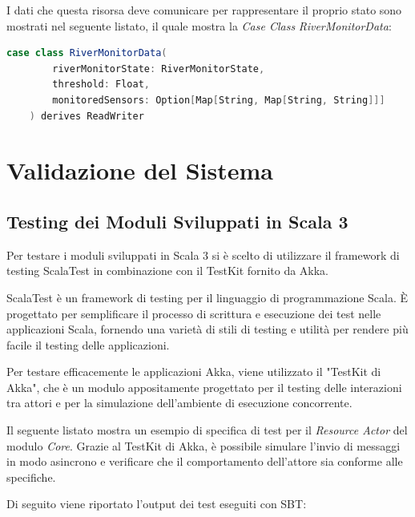 \documentclass{scrartcl}
\begin{document}
I dati che questa risorsa deve comunicare per rappresentare il proprio stato sono mostrati nel seguente listato, il quale mostra la \textit{Case Class} \textit{RiverMonitorData}:
\begin{lstlisting}[language=Scala]
    case class RiverMonitorData(
        riverMonitorState: RiverMonitorState,
        threshold: Float,
        monitoredSensors: Option[Map[String, Map[String, String]]]
    ) derives ReadWriter
\end{lstlisting}

\section{Validazione del Sistema}

\subsection{Testing dei Moduli Sviluppati in Scala 3}

Per testare i moduli sviluppati in Scala 3 si è scelto di utilizzare il framework di testing ScalaTest\cite{scalatest} in combinazione con il TestKit fornito da Akka.

ScalaTest è un framework di testing per il linguaggio di programmazione Scala. È progettato per semplificare il processo di scrittura e esecuzione dei test nelle applicazioni Scala, fornendo una varietà di stili di testing e utilità per rendere più facile il testing delle applicazioni.

Per testare efficacemente le applicazioni Akka, viene utilizzato il "TestKit di Akka", che è un modulo appositamente progettato per il testing delle interazioni tra attori e per la simulazione dell'ambiente di esecuzione concorrente.

Il seguente listato mostra un esempio di specifica di test per il \textit{Resource Actor} del modulo \textit{Core}. Grazie al TestKit di Akka, è possibile simulare l'invio di messaggi in modo asincrono e verificare che il comportamento dell'attore sia conforme alle specifiche.



Di seguito viene riportato l'output dei test eseguiti con SBT:
\end{document}
